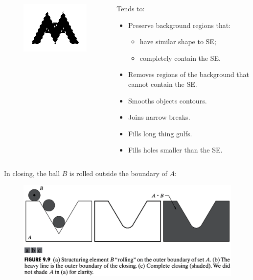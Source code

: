 \begin{frame}
\begin{columns}
\begin{column}{.3\textwidth}
\begin{figure}
\centering
\includegraphics[width=\textwidth]{closeb.png}
\end{figure}
\end{column}
\begin{column}{.7\textwidth}
Tends to:
\begin{itemize}
\item Preserve background regions that:
\begin{itemize}
\item have similar shape to SE;
\item completely contain the SE.
\end{itemize}
\item Removes regions of the background that cannot contain the SE.
\item Smooths objects contours.
\item Joins narrow breaks.
\item Fills long thing gulfs.
\item Fills holes smaller than the SE.
\end{itemize}
\end{column}
\end{columns}
\end{frame}

\begin{frame}
In closing, the ball $B$ is rolled outside the boundary of $A$:
\begin{figure}[!h]
\includegraphics[width=\textwidth]{fig-9-9.png}
\end{figure}
\end{frame}

